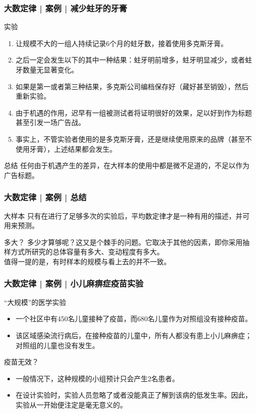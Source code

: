 \begin{frame}
  \frametitle{大数定律 | 案例 | 减少蛀牙的牙膏}
  \begin{block}{实验}
    \begin{enumerate}
      \item 让规模不大的一组人持续记录6个月的蛀牙数，接着使用多克斯牙膏。
      \item 之后一定会发生以下的其中一种结果：蛀牙明前增多，蛀牙明显减少，或者蛀牙数量无显著变化。
      \item 如果是第一或者第三种结果，多克斯公司编档保存好（藏好甚至销毁），然后重新实验。
      \item 由于机遇的作用，迟早有一组被测试者将证明很好的效果，足以好到作为标题甚至引发一场广告战。
      \item 事实上，不管实验者使用的是多克斯牙膏，还是继续使用原来的品牌（甚至不使用牙膏），上述结果都会发生。
    \end{enumerate}
  \end{block}
  \pause
  \vspace{-0.5em}
  \begin{block}{总结}
    任何由于机遇产生的差异，在大样本的使用中都是微不足道的，不足以作为广告标题。
  \end{block}
\end{frame}

\begin{frame}
  \frametitle{大数定律 | 案例 | 总结}
  \begin{block}{大样本}
    只有在进行了足够多次的实验后，平均数定律才是一种有用的描述，并可用来预测。
  \end{block}
  \pause
  \begin{block}{多大？}
    多少才算够呢？这又是个棘手的问题。它取决于其他的因素，即你采用抽样方式所研究的总体容量有多大、变动程度有多大。\\
    \vspace{0.5em}
    值得一提的是，有时样本的规模与看上去的并不一致。
  \end{block}
\end{frame}

\begin{frame}
  \frametitle{大数定律 | 案例 | 小儿麻痹症疫苗实验}
  \begin{block}{“大规模”的医学实验}
    \begin{itemize}
      \item 一个社区中有450名儿童接种了疫苗，而680名儿童作为对照组没有接种疫苗。
      \item 该区域感染流行病后，在接种疫苗的儿童中，所有人都没有患上小儿麻痹症；对照组的儿童也没有发生。
    \end{itemize}
  \end{block}
  \pause \pause \pause \pause
  \begin{block}{疫苗无效？}
    \begin{itemize}
      \item 一般情况下，这种规模的小组预计只会产生2名患者。
      \item 在设计实验时，实验人员忽略了或者没能真正了解到该病的低发生率。因此，实验从一开始便注定是毫无意义的。
    \end{itemize}
  \end{block}
\end{frame}

